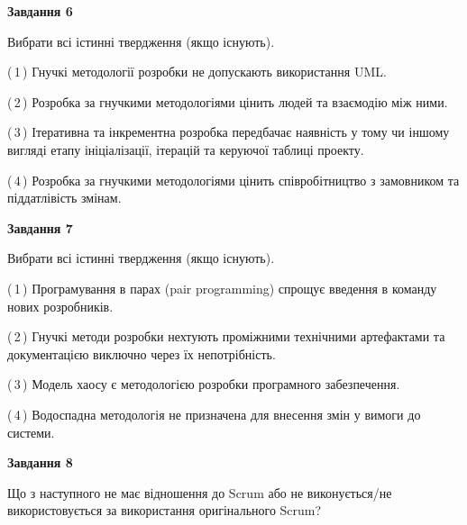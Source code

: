 \documentclass[10pt, ukrainian]{article}
\begin{document}
{\begin {large}
\newpage

{\begin {center}\textbf{Завдання 6}\end {center}}\par
Вибрати всі істинні твердження (якщо існують).\par
\vspace{2mm}



(\,1\,) Гнучкі методології розробки не допускають використання UML. %



(\,2\,) Розробка за гнучкими методологіями цінить людей та взаємодію між ними. %



(\,3\,) Ітеративна та інкрементна розробка передбачає наявність у тому чи іншому вигляді етапу ініціалізації, ітерацій та керуючої таблиці проекту. %



(\,4\,) Розробка за гнучкими методологіями цінить співробітництво з замовником та піддатлівість змінам. %


{\begin {center}\textbf{Завдання 7}\end {center}}\par
Вибрати всі істинні твердження (якщо існують).\par
\vspace{2mm}



(\,1\,) Програмування в парах (pair programming) спрощує введення в команду нових розробників. %



(\,2\,) Гнучкі методи розробки нехтують проміжними технічними артефактами та документацією виключно через їх непотрібність. %



(\,3\,) Модель хаосу є методологією розробки програмного забезпечення. %



(\,4\,) Водоспадна методологія не призначена для внесення змін у вимоги до системи. %


{\begin {center}\textbf{Завдання 8}\end {center}}\par
Що з наступного не має відношення до Scrum або не виконується/не використовується за використання оригінального Scrum?\par
\vspace{2mm}




\end{large}}
\end{document}
